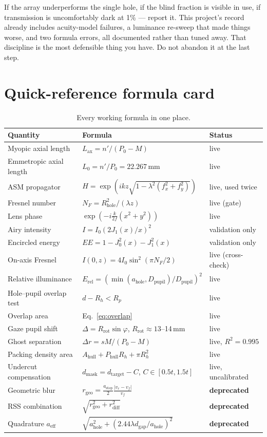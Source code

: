 \documentclass[11pt]{report}
\newcommand{\ahole}{a_{\text{hole}}}
\newcommand{\dgap}{d_{\text{gap}}}
\newcommand{\vr}{v_r}
\newcommand{\vf}{v_f}
\newcommand{\Dpupil}{D_{\text{pupil}}}
\begin{document}
If the array underperforms the single hole, if the blind fraction is visible in use, if
transmission is uncomfortably dark at 1\% --- report it. This project's record already includes
acuity-model failures, a luminance re-sweep that made things worse, and two formula errors, all
documented rather than tuned away. That discipline is the most defensible thing you have. Do not
abandon it at the last step.

\appendix

\chapter{Quick-reference formula card}

\begin{longtable}{p{5.2cm}p{6.2cm}p{3.0cm}}
\caption{Every working formula in one place.}\\
\toprule
\textbf{Quantity} & \textbf{Formula} & \textbf{Status} \\
\midrule
\endhead
Myopic axial length & $L_{\text{ax}} = n'/(P_0-M)$ & live \\
Emmetropic axial length & $L_0 = n'/P_0 = 22.267$\,mm & live \\
ASM propagator & $H = \exp(ikz\sqrt{1-\lambda^2(f_x^2+f_y^2)})$ & live, used twice \\
Fresnel number & $N_F = R_{\text{hole}}^2/(\lambda z)$ & live (gate) \\
Lens phase & $\exp(-i\frac{k}{2f}(x^2+y^2))$ & live \\
Airy intensity & $I = I_0(2J_1(x)/x)^2$ & validation only \\
Encircled energy & $EE = 1-J_0^2(x)-J_1^2(x)$ & validation only \\
On-axis Fresnel & $I(0,z)=4I_0\sin^2(\pi N_F/2)$ & live (cross-check) \\
Relative illuminance & $E_{\text{rel}}=(\min(\ahole,\Dpupil)/\Dpupil)^2$ & live \\
Hole--pupil overlap test & $d-R_h<R_p$ & live \\
Overlap area & Eq.~\ref{eq:overlap} & live \\
Gaze pupil shift & $\Delta=R_{\text{rot}}\sin\varphi$, $R_{\text{rot}}\approx13$--14\,mm & live \\
Ghost separation & $\Delta r = sM/(P_0-M)$ & live, $R^2=0.995$ \\
Packing density area & $A_{\text{hull}}+P_{\text{hull}}R_h+\pi R_h^2$ & live \\
Undercut compensation & $d_{\text{mask}}=d_{\text{target}}-C$, $C\in[0.5t,1.5t]$ & live, uncalibrated \\
Geometric blur & $r_{\text{geo}}=\frac{a_{\text{stop}}}{2}\frac{|\vr-\vf|}{\vf}$ & \textbf{deprecated} \\
RSS combination & $\sqrt{r_{\text{geo}}^2+r_{\text{diff}}^2}$ & \textbf{deprecated} \\
Quadrature $a_{\text{eff}}$ & $\sqrt{\ahole^2+(2.44\lambda\dgap/\ahole)^2}$ & \textbf{deprecated} \\
\bottomrule
\end{longtable}
\end{document}
